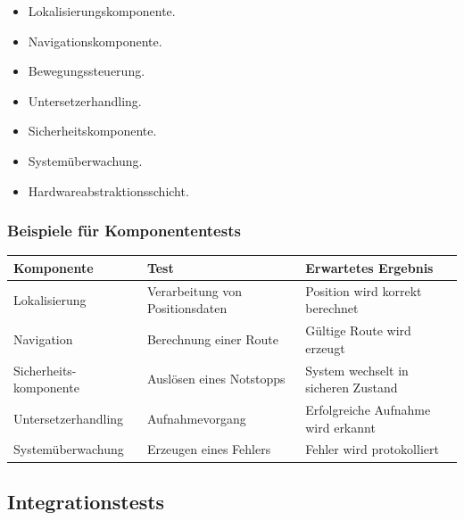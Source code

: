 \documentclass[
  a4paper,
  12pt,
  DIV=12,        %
  parskip=half,  %
  headings=small %
]{scrartcl}
\theoremstyle{definition}
\providecommand{\tightlist}{%
  \setlength{\itemsep}{0pt}\setlength{\parskip}{0pt}}
\theoremstyle{definition}
\begin{document}
\begin{itemize}
\tightlist
\item
  Lokalisierungskomponente.
\item
  Navigationskomponente.
\item
  Bewegungssteuerung.
\item
  Untersetzerhandling.
\item
  Sicherheitskomponente.
\item
  Systemüberwachung.
\item
  Hardwareabstraktionsschicht.
\end{itemize}

\subsubsection{Beispiele für
Komponententests}\label{beispiele-fuxfcr-komponententests}

\begin{longtable}[]{@{}
  >{\raggedright\arraybackslash}p{}
  >{\raggedright\arraybackslash}p{}
  >{\raggedright\arraybackslash}p{}@{}}
\toprule\noalign{}
\begin{minipage}[b]{\linewidth}\raggedright
Komponente
\end{minipage} & \begin{minipage}[b]{\linewidth}\raggedright
Test
\end{minipage} & \begin{minipage}[b]{\linewidth}\raggedright
Erwartetes Ergebnis
\end{minipage} \\
\midrule\noalign{}
\endhead
\bottomrule\noalign{}
\endlastfoot
Lokalisierung & Verarbeitung von Positionsdaten & Position wird korrekt
berechnet \\
Navigation & Berechnung einer Route & Gültige Route wird erzeugt \\
Sicherheits-komponente & Auslösen eines Notstopps & System wechselt in
sicheren Zustand \\
Untersetzerhandling & Aufnahmevorgang & Erfolgreiche Aufnahme wird
erkannt \\
Systemüberwachung & Erzeugen eines Fehlers & Fehler wird
protokolliert \\
\end{longtable}

\subsection{Integrationstests}\label{integrationstests-1}
\end{document}
